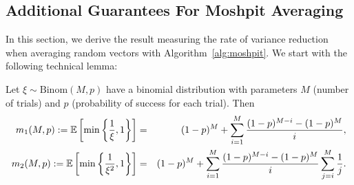 \subsection{Additional Guarantees For Moshpit Averaging}\label{sec:mix_rand_proof}
In this section,  we derive the result measuring the rate of variance reduction when averaging random vectors with Algorithm~\ref{alg:moshpit}. We start with the following technical lemma:
\begin{lemma}\label{lem:ode_lemma}
    Let $\xi \sim \text{Binom}(M,p)$ have a binomial distribution with parameters $M$ (number of trials) and $p$ (probability of success for each trial). Then
    \begin{eqnarray}
        m_1(M,p) := \mathbb{E}\left[\min\left\{\frac{1}{\xi},1\right\}\right] &=& (1-p)^M + \sum\limits_{i=1}^M\frac{(1-p)^{M-i} - (1-p)^M}{i}, \label{eq:binom_first_inverse_moment}\\
        m_2(M,p) := \mathbb{E}\left[\min\left\{\frac{1}{\xi^2},1\right\}\right] &=& (1-p)^M + \sum\limits_{i=1}^M\frac{(1-p)^{M-i} - (1-p)^M}{i}\sum\limits_{j=i}^M\frac{1}{j}. \label{eq:binom_second_inverse_moment}
    \end{eqnarray}
\end{lemma}
